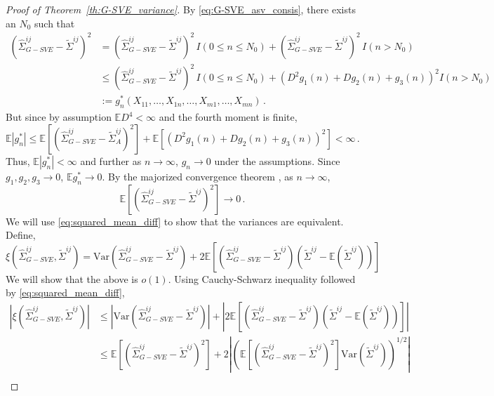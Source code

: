 \documentclass[11pt]{article}
\newcommand{\E}{\mathbb{E}}
\newcommand{\Var}{\text{Var}}
\theoremstyle{remark}
\begin{document}
\begin{proof}[Proof of Theorem~\ref{th:G-SVE_variance}]
By \eqref{eq:G-SVE_asv_consis}, there exists an $N_0$ such that
\begin{align*}
\left(\hat{\Sigma}_{G-SVE}^{ij} - \tilde{\Sigma}^{ij} \right)^2 &= \left(\hat{\Sigma}_{G-SVE}^{ij} - \tilde{\Sigma}^{ij} \right)^2 \, I(0 \leq n \leq N_0) + \left(\hat{\Sigma}_{G-SVE}^{ij} - \tilde{\Sigma}^{ij} \right)^2 \, I(n > N_0)\\
& \leq \left(\hat{\Sigma}_{G-SVE}^{ij} - \tilde{\Sigma}^{ij} \right)^2 \, I(0 \leq n \leq N_0) +  \left(D^2g_1(n) + Dg_2(n) + g_3(n) \right)^2 I(n > N_0)\\
& := g_n^*(X_{11}, \dots, X_{1n}, \dots, X_{m1}, \dots, X_{mn})\,.
\end{align*}
But since by assumption $\E D^4 <\infty$ and the fourth moment is finite,
\[
\E \left| g_n^* \right| \leq  \E \left[\left(\hat{\Sigma}_{G-SVE}^{ij} - \tilde{\Sigma}_{A}^{ij} \right)^2 \right] + \E \left[\left(D^2g_1(n) + Dg_2(n) + g_3(n) \right)^2 \right] < \infty\,.
\]
Thus, $\E \left| g_n^* \right| < \infty$ and further as $n \to \infty$, $g_n \to 0$ under the assumptions. Since $g_1, g_2, g_3 \to 0$, $\E g_n^* \to 0$. By the majorized convergence theorem \citep{zeid:2013}, as $n \to \infty$,
\begin{equation}
\label{eq:squared_mean_diff}
  \E \left[\left(\hat{\Sigma}_{G-SVE}^{ij} - \tilde{\Sigma}^{ij} \right)^2 \right] \to 0\,.
\end{equation}
%
We will use \eqref{eq:squared_mean_diff} to show that the variances are equivalent. Define,
\[
\xi\left(\hat{\Sigma}_{G-SVE}^{ij}, \tilde{\Sigma}^{ij} \right) = \Var\left(\hat{\Sigma}_{G-SVE}^{ij} - \tilde{\Sigma}^{ij} \right) + 2 \E\left[ \left(\hat{\Sigma}_{G-SVE}^{ij} -  \tilde{\Sigma}^{ij} \right) \left(\tilde{\Sigma}^{ij}  - \E \left( \tilde{\Sigma}^{ij} \right) \right) \right]
\]
We will show that the above is $o(1)$. Using Cauchy-Schwarz inequality followed by \eqref{eq:squared_mean_diff},
\begin{align*}
\left|  \xi\left(\hat{\Sigma}_{G-SVE}^{ij}, \tilde{\Sigma}^{ij} \right) \right| & \leq \left| \Var\left(\hat{\Sigma}_{G-SVE}^{ij} -  \tilde{\Sigma}^{ij} \right) \right| + \left| 2 \E\left[ \left(\hat{\Sigma}_{G-SVE}^{ij} - \tilde{\Sigma}^{ij} \right) \left(\tilde{\Sigma}^{ij}  - \E \left( \tilde{\Sigma}^{ij} \right) \right) \right]\right| \\ 
& \leq \E\left[\left(\hat{\Sigma}_{G-SVE}^{ij} -  \tilde{\Sigma}^{ij} \right)^2 \right] + 2 \left| \left(\E\left[ \left(\hat{\Sigma}_{G-SVE}^{ij} - \tilde{\Sigma}^{ij} \right)^2 \right]  \Var\left(\tilde{\Sigma}^{ij}  \right)   \right)^{1/2}\right| \\ 

\end{align*}
\end{proof}
\end{document}
